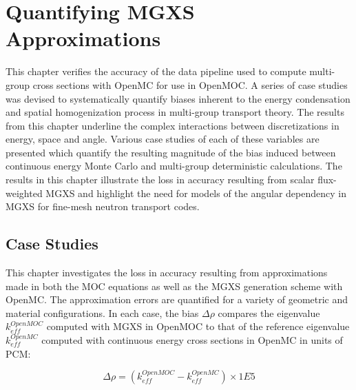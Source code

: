 \chapter{Quantifying MGXS Approximations}
\label{chap:biases}

This chapter verifies the accuracy of the data pipeline used to compute multi-group cross sections with OpenMC for use in OpenMOC. A series of case studies was devised to systematically quantify biases inherent to the energy condensation and spatial homogenization process in multi-group transport theory. The results from this chapter underline the complex interactions between discretizations in energy, space and angle. Various case studies of each of these variables are presented which quantify the resulting magnitude of the bias induced between continuous energy Monte Carlo and multi-group deterministic calculations. The results in this chapter illustrate the loss in accuracy resulting from scalar flux-weighted \ac{MGXS} and highlight the need for models of the angular dependency in \ac{MGXS} for fine-mesh neutron transport codes.


\section{Case Studies}
\label{sec:chap4-case-studies}

This chapter investigates the loss in accuracy resulting from approximations made in both the \ac{MOC} equations as well as the \ac{MGXS} generation scheme with OpenMC. The approximation errors are quantified for a variety of geometric and material configurations. In each case, the bias $\Delta\rho$ compares the eigenvalue $k_{eff}^{OpenMOC}$ computed with \ac{MGXS} in OpenMOC to that of the reference eigenvalue $k_{eff}^{OpenMC}$ computed with continuous energy cross sections in OpenMC in units of \ac{PCM}:

\begin{equation}
\label{eqn:chap4-delta-rho}
\Delta\rho = \left(k_{eff}^{OpenMOC} - k_{eff}^{OpenMC}\right) \times 1E5
\end{equation}

